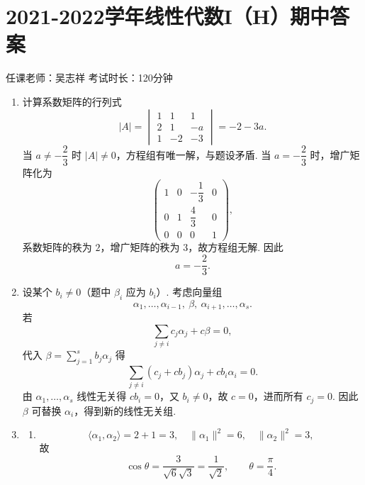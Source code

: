 \section{2021-2022学年线性代数I（H）期中答案}

\begin{center}
    任课老师：吴志祥\hspace{4em} 考试时长：120分钟
\end{center}
\begin{enumerate}
    \item 计算系数矩阵的行列式
    \[
        |A|=\begin{vmatrix}
            1&1&1\\
            2&1&-a\\
            1&-2&-3
        \end{vmatrix}=-2-3a.
    \]
    当 $a\neq-\dfrac23$ 时 $|A|\neq 0$，方程组有唯一解，与题设矛盾. 当 $a=-\dfrac23$ 时，增广矩阵化为
    \[
        \begin{pmatrix}
            1&0&-\dfrac13&0\\
            0&1&\dfrac43&0\\
            0&0&0&1
        \end{pmatrix},
    \]
    系数矩阵的秩为 $2$，增广矩阵的秩为 $3$，故方程组无解. 因此
    \[
        a=-\frac23.
    \]

    \item 设某个 $b_i\neq 0$（题中 $\beta_i$ 应为 $b_i$）. 考虑向量组
    \[
        \alpha_1,\ldots,\alpha_{i-1},\ \beta,\ \alpha_{i+1},\ldots,\alpha_s.
    \]
    若
    \[
        \sum_{j\neq i}c_j\alpha_j+c\beta=0,
    \]
    代入 $\beta=\sum_{j=1}^sb_j\alpha_j$ 得
    \[
        \sum_{j\neq i}(c_j+cb_j)\alpha_j+cb_i\alpha_i=0.
    \]
    由 $\alpha_1,\ldots,\alpha_s$ 线性无关得 $cb_i=0$，又 $b_i\neq 0$，故 $c=0$，进而所有 $c_j=0$. 因此 $\beta$ 可替换 $\alpha_i$，得到新的线性无关组.

    \item
    \begin{enumerate}
        \item
        \[
            \langle\alpha_1,\alpha_2\rangle=2+1=3,\quad
            \|\alpha_1\|^2=6,\quad
            \|\alpha_2\|^2=3,
        \]
        故
        \[
            \cos\theta=\frac{3}{\sqrt{6}\sqrt{3}}=\frac{1}{\sqrt2},
            \qquad \theta=\frac{\pi}{4}.
        \]


\end{enumerate}
\end{enumerate}
